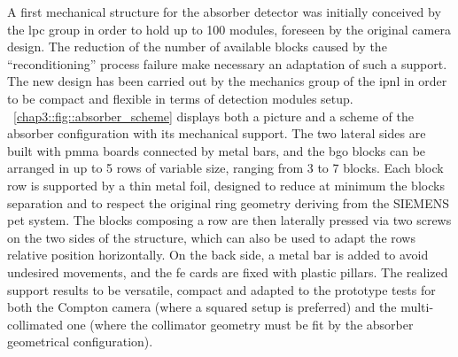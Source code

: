 A first mechanical structure for the absorber detector was initially conceived by the \gls{lpc} group in order to hold up to 100 modules, foreseen by the original camera design. The reduction of the number of available blocks caused by the \enquote{reconditioning} process failure make necessary an adaptation of such a support. The new design has been carried out by the mechanics group of the \gls{ipnl} in order to be compact and flexible in terms of detection modules setup. \figurename~\ref{chap3::fig::absorber_scheme} displays both a picture and a scheme of the absorber configuration with its mechanical support. The two lateral sides are built with \gls{pmma} boards connected by metal bars, and the \gls{bgo} blocks can be arranged in up to 5 rows of variable size, ranging from 3 to 7 blocks. Each block row is supported by a thin metal foil, designed to reduce at minimum the blocks separation and to respect the original ring geometry deriving from the SIEMENS \gls{pet} system. The blocks composing a row are then laterally pressed via two screws on the two sides of the structure, which can also be used to adapt the rows relative position horizontally. On the back side, a metal bar is added to avoid undesired movements, and the \gls{fe} cards are fixed with plastic pillars. The realized support results to be versatile, compact and adapted to the prototype tests for both the Compton camera (where a squared setup is preferred) and the multi-collimated one (where the collimator geometry must be fit by the absorber geometrical configuration).       

